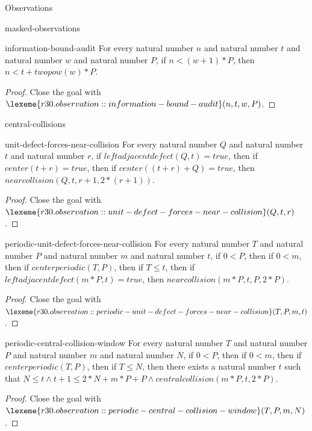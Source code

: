 \begin{lexlean}{Observations}
\begin{section}{masked-observations}
\begin{theorem}{information-bound-audit}
For every natural number \(n\) and natural number \(t\) and natural number \(w\) and natural number \(P\), if \(n < (w + 1) * P\), then \(n < t + twopow(w) * P\).
\begin{proof}
Close the goal with \(\lexeme{r30.observation::information-bound-audit}(n, t, w, P)\).
\end{proof}
\end{theorem}

\end{section}

\begin{section}{central-collisions}

\begin{theorem}{unit-defect-forces-near-collision}
For every natural number \(Q\) and natural number \(t\) and natural number \(r\), if \(leftadjacentdefect(Q, t) = true\), then if \(center(t + r) = true\), then if \(center((t + r) + Q) = true\), then \(nearcollision(Q, t, r + 1, 2 * (r + 1))\).
\begin{proof}
Close the goal with \(\lexeme{r30.observation::unit-defect-forces-near-collision}(Q, t, r)\).
\end{proof}
\end{theorem}

\begin{theorem}{periodic-unit-defect-forces-near-collision}
For every natural number \(T\) and natural number \(P\) and natural number \(m\) and natural number \(t\), if \(0 < P\), then if \(0 < m\), then if \(centerperiodic(T, P)\), then if \(T ≤ t\), then if \(leftadjacentdefect(m * P, t) = true\), then \(nearcollision(m * P, t, P, 2 * P)\).
\begin{proof}
Close the goal with \(\lexeme{r30.observation::periodic-unit-defect-forces-near-collision}(T, P, m, t)\).
\end{proof}
\end{theorem}

\begin{theorem}{periodic-central-collision-window}
For every natural number \(T\) and natural number \(P\) and natural number \(m\) and natural number \(N\), if \(0 < P\), then if \(0 < m\), then if \(centerperiodic(T, P)\), then if \(T ≤ N\), then there exists a natural number \(t\) such that \(N ≤ t ∧ t + 1 ≤ 2 * N + m * P + P ∧ centralcollision(m * P, t, 2 * P)\).
\begin{proof}
Close the goal with \(\lexeme{r30.observation::periodic-central-collision-window}(T, P, m, N)\).
\end{proof}
\end{theorem}


\end{section}
\end{lexlean}

